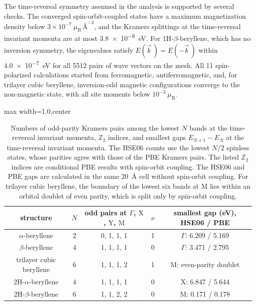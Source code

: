 The time-reversal symmetry assumed in the analysis is supported by several checks.
The converged spin-orbit-coupled states have a maximum magnetization density below $3\times10^{-7}~\mu_{\mathrm{B}}\,\text{\AA}^{-3}$,
and the Kramers splittings at the time-reversal invariant momenta are at most \qty{3.8e-6}{\electronvolt}.
For 1H-$\beta$-beryllene,
which has no inversion symmetry,
the eigenvalues satisfy $E(\vec{k}\,)=E(-\vec{k}\,)$ within \qty{4.0e-7}{\electronvolt} for all 5512 pairs of wave vectors on the mesh.
All 11 spin-polarized calculations started from ferromagnetic,
antiferromagnetic,
and,
for trilayer cubic beryllene,
inversion-odd magnetic configurations converge to the non-magnetic state,
with all site moments below $10^{-3}~\mu_{\mathrm{B}}$.

\begin{table}[!htbp]
\centering
{}
\begin{adjustbox}{max width=1.0\linewidth,center}
\begin{tabular}{ccccc}
\hline
\rowcolor{gray!25}
structure
& $N$
& odd pairs at $\Gamma$, $\mathrm{X}$, $\mathrm{Y}$, $\mathrm{M}$
& $\nu$
& smallest gap (eV), HSE06 / PBE \\
\hline
$\alpha$-beryllene & 2 & 0, 1, 1, 1 & 1 & $\Gamma$: 6.209 / 5.169 \\
$\beta$-beryllene & 4 & 1, 1, 1, 1 & 0 & $\Gamma$: 3.471 / 2.795 \\
trilayer cubic beryllene & 6 & 1, 1, 1, 2 & 1 & $\mathrm{M}$: even-parity doublet \\
2H-$\alpha$-beryllene & 4 & 1, 1, 1, 1 & 0 & $\mathrm{X}$: 6.847 / 5.644 \\
2H-$\beta$-beryllene & 6 & 1, 1, 2, 2 & 0 & $\mathrm{M}$: 0.171 / 0.178 \\
\hline
\end{tabular}
\end{adjustbox}
\caption{Numbers of odd-parity Kramers pairs among the lowest $N$ bands at the time-reversal invariant momenta,
$\mathbb{Z}_2$ indices,
and smallest gaps $E_{N+1}-E_{N}$ at the time-reversal invariant momenta.
The HSE06 counts use the lowest $N/2$ spinless states,
whose parities agree with those of the PBE Kramers pairs.
The listed $\mathbb{Z}_2$ indices are conditional PBE results with spin-orbit coupling.
The HSE06 and PBE gaps are calculated in the same \qty{20}{\angstrom} cell without spin-orbit coupling.
For trilayer cubic beryllene,
the boundary of the lowest six bands at $\mathrm{M}$ lies within an orbital doublet of even parity,
which is split only by spin-orbit coupling.}
\label{tab:proj3_hse_parity}
\end{table}

